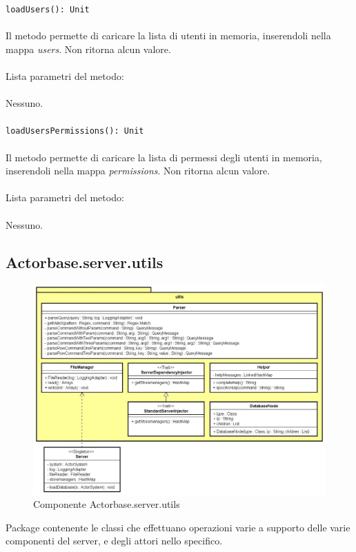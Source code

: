 \documentclass[a4paper]{article}
\begin{document}
			\texttt{loadUsers(): Unit}
			\\ \\
			Il metodo permette di caricare la lista di utenti in memoria, inserendoli nella mappa \emph{users}. Non ritorna alcun valore.
			\\ \\
			Lista parametri del metodo:
			\\ \\
			Nessuno.
			\\ \\
			\texttt{loadUsersPermissions(): Unit}
			\\ \\
			Il metodo permette di caricare la lista di permessi degli utenti in memoria, inserendoli nella mappa \emph{permissions}. Non ritorna alcun valore.
			\\ \\
			Lista parametri del metodo:
			\\ \\
			Nessuno.
	\subsection{Actorbase.server.utils}
		\begin{figure}[H]
			\centering
			\includegraphics[width=\textwidth]{Server/utilsLevel.jpg}
			\caption{Componente Actorbase.server.utils}
		\end{figure}
		Package contenente le classi che effettuano operazioni varie a supporto delle varie componenti del server, e degli attori nello specifico.
		
			
\end{document}
